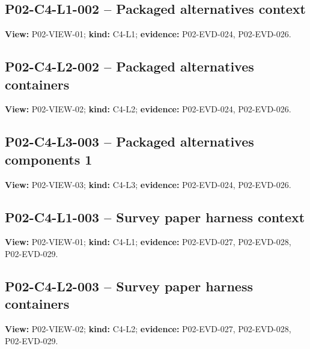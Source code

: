 \documentclass[10pt,letterpaper]{article}
\begin{document}
\subsection{P02-C4-L1-002 -- Packaged alternatives context}
\textbf{View:} P02-VIEW-01; \textbf{kind:} C4-L1; \textbf{evidence:} P02-EVD-024, P02-EVD-026.\par
{}
\clearpage

\subsection{P02-C4-L2-002 -- Packaged alternatives containers}
\textbf{View:} P02-VIEW-02; \textbf{kind:} C4-L2; \textbf{evidence:} P02-EVD-024, P02-EVD-026.\par
{}
\clearpage

\subsection{P02-C4-L3-003 -- Packaged alternatives components 1}
\textbf{View:} P02-VIEW-03; \textbf{kind:} C4-L3; \textbf{evidence:} P02-EVD-024, P02-EVD-026.\par
{}
\clearpage

\subsection{P02-C4-L1-003 -- Survey paper harness context}
\textbf{View:} P02-VIEW-01; \textbf{kind:} C4-L1; \textbf{evidence:} P02-EVD-027, P02-EVD-028, P02-EVD-029.\par
{}
\clearpage

\subsection{P02-C4-L2-003 -- Survey paper harness containers}
\textbf{View:} P02-VIEW-02; \textbf{kind:} C4-L2; \textbf{evidence:} P02-EVD-027, P02-EVD-028, P02-EVD-029.\par
{}
\clearpage
\end{document}
